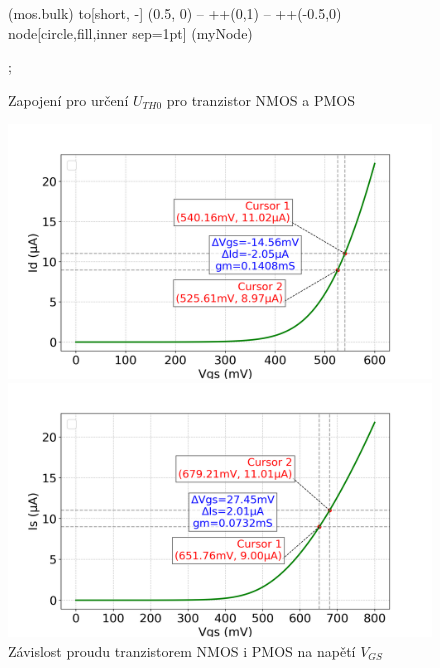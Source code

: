 \begin{figure}[H]
\begin{minipage}{0.5\textwidth}
\begin{circuitikz}[scale=1, transform shape]
              (mos.bulk) to[short, -] (0.5, 0) -- ++(0,1) -- ++(-0.5,0)  node[circle,fill,inner sep=1pt] (myNode) {}

            ;
        \end{circuitikz}

        \vspace{5mm} 
    \end{minipage}
    \caption{\label{cod:cod_NP_WL_const} Zapojení pro určení \(U_{TH0}\) pro tranzistor NMOS a PMOS}
\end{figure}

\begin{figure}[h]
    \hspace{-20mm}
    \begin{minipage}{0.5\textwidth}
        \includegraphics[height=0.25\textheight]{text/img/N-KP.png}
    \end{minipage}
    \hfill
    \begin{minipage}{0.5\textwidth}
        \includegraphics[height=0.25\textheight]{text/img/P-KP.png}
    \end{minipage}
    \caption{\label{fig:graf_NP_KP} Závislost proudu tranzistorem NMOS i PMOS na napětí \(V_{GS}\)}
\end{figure}

